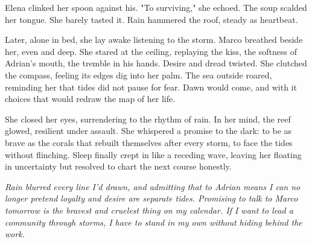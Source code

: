 Elena clinked her spoon against his. "To surviving," she echoed. The soup scalded her tongue. She barely tasted it. Rain hammered the roof, steady as heartbeat.

Later, alone in bed, she lay awake listening to the storm. Marco breathed beside her, even and deep. She stared at the ceiling, replaying the kiss, the softness of Adrian's mouth, the tremble in his hands. Desire and dread twisted. She clutched the compass, feeling its edges dig into her palm. The sea outside roared, reminding her that tides did not pause for fear. Dawn would come, and with it choices that would redraw the map of her life.

She closed her eyes, surrendering to the rhythm of rain. In her mind, the reef glowed, resilient under assault. She whispered a promise to the dark: to be as brave as the corals that rebuilt themselves after every storm, to face the tides without flinching. Sleep finally crept in like a receding wave, leaving her floating in uncertainty but resolved to chart the next course honestly.


\noindent\textit{Rain blurred every line I'd drawn, and admitting that to Adrian means I can no longer pretend loyalty and desire are separate tides. Promising to talk to Marco tomorrow is the bravest and cruelest thing on my calendar. If I want to lead a community through storms, I have to stand in my own without hiding behind the work.}
